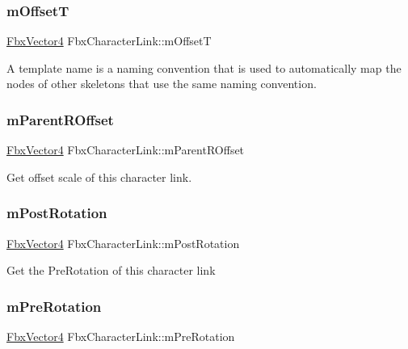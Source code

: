 \subsubsection{\texorpdfstring{m\+OffsetT}{mOffsetT}}
{\footnotesize\ttfamily \hyperlink{class_fbx_vector4}{Fbx\+Vector4} Fbx\+Character\+Link\+::m\+OffsetT}



A template name is a naming convention that is used to automatically map the nodes of other skeletons that use the same naming convention. 

\mbox{\label{class_fbx_character_link_a82c5bd03f0927e100bd8ee6315cd5db0}} 
\subsubsection{\texorpdfstring{m\+Parent\+R\+Offset}{mParentROffset}}
{\footnotesize\ttfamily \hyperlink{class_fbx_vector4}{Fbx\+Vector4} Fbx\+Character\+Link\+::m\+Parent\+R\+Offset}



Get offset scale of this character link. 

\mbox{\label{class_fbx_character_link_a35c2a40e3cbf60ed88c23487c3c57526}} 
\subsubsection{\texorpdfstring{m\+Post\+Rotation}{mPostRotation}}
{\footnotesize\ttfamily \hyperlink{class_fbx_vector4}{Fbx\+Vector4} Fbx\+Character\+Link\+::m\+Post\+Rotation}



Get the Pre\+Rotation of this character link 

\mbox{\label{class_fbx_character_link_ad72d5286a98d4e83b71bb2c53885d6ce}} 
\subsubsection{\texorpdfstring{m\+Pre\+Rotation}{mPreRotation}}
{\footnotesize\ttfamily \hyperlink{class_fbx_vector4}{Fbx\+Vector4} Fbx\+Character\+Link\+::m\+Pre\+Rotation}



